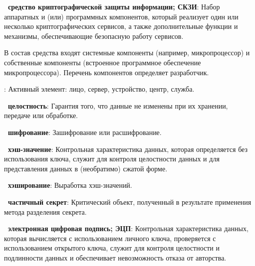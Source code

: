 {\bf \thedefctr~средство криптографической защиты информации; СКЗИ}:
Набор аппаратных и (или) программных компонентов, который реализует один или 
несколько криптографических сервисов, а также дополнительные функции и 
механизмы, обеспечивающие безопасную работу сервисов.

\begin{note}
В состав средства входят системные компоненты (например, микропроцессор) и
собственные компоненты (встроенное программное обеспечение микропроцессора).
Перечень компонентов определяет разработчик.
\end{note}


:
Активный элемент: лицо, сервер, устройство, центр, служба.


{\bf \thedefctr~целостность}:
Гарантия того, что данные не изменены при их хранении, передаче или обработке. 

{\bf \thedefctr~шифрование}:
Зашифрование или расшифрование.

{\bf \thedefctr~хэш-значение}:
Контрольная характеристика данных, которая определяется без использования ключа,
служит для контроля целостности данных и для представления данных в (необратимо)
сжатой форме.

{\bf \thedefctr~хэширование}:
Выработка хэш-значений.

{\bf \thedefctr~частичный секрет}:
Критический объект, 
полученный в результате применения метода разделения секрета.

{\bf \thedefctr~электронная цифровая подпись; ЭЦП}:
Контрольная характеристика данных, которая вычисляется с использованием личного
ключа, проверяется с использованием открытого ключа, служит для контроля
целостности и подлинности данных и обеспечивает невозможность отказа от
авторства.

